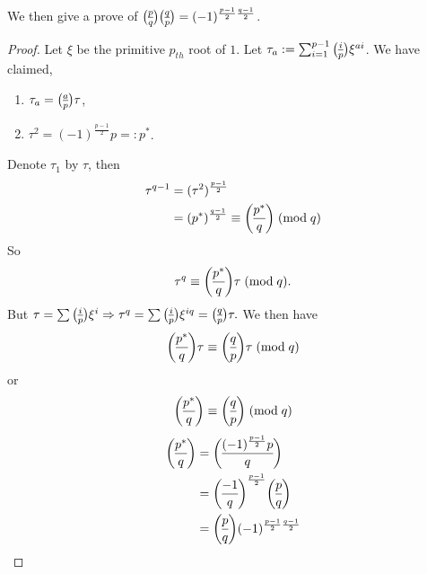 We then give a prove of $\leg{p}{q}\leg{q}{p}=(-1)^{\frac{p-1}{2}\frac{q-1}{2}}$.
\begin{proof}
Let $\xi$ be the primitive $p_{th}$ root of $1$. Let $\tau_a:=\sum_{i=1}^{p-1}\leg{i}{p}\xi^{ai}$. We have claimed, \begin{enumerate} 
\item
$\tau_a=\leg{a}{p}\tau$,
\item
$\tau^2 = (-1)^{\frac{p-1}{2}}p=:p^*$.
\end{enumerate}
Denote $\tau_1$ by $\tau$, then
\begin{align*}
\tau^{q-1} &= (\tau^2)^{\frac{p-1}{2}}\\ &=(p^*)^{\frac{q-1}{2}}\con{\leg{p^*}{q}}{q}
\end{align*}
So $$\tau^{q}\con{\leg{p^*}{q}\tau}{q}.$$
But $\tau=\sum\leg{i}{p}\xi^i\Rightarrow \tau^q = \sum\leg{i}{p}\xi^{iq}=\leg{q}{p}\tau.$ We then have
$$\leg{p^*}{q}\tau \con{\leg{q}{p}\tau}{q}$$
or $$\leg{p^*}{q} \con{\leg{q}{p}}{q}$$
\begin{align*}
\leg{p^*}{q}&=\leg{(-1)^{\frac{p-1}{2}}p}{q}\\
&={\leg{-1}{q}}^{\frac{p-1}{2}}\leg{p}{q}\\
&=\leg{p}{q}(-1)^{\frac{p-1}{2}\frac{q-1}{2}}
\end{align*}
\end{proof}
